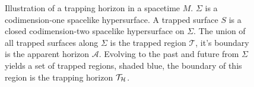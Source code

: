 \begin{figure}[!h]
\centering
{}
\label{fig:trappinghorizon}
\caption[Illustration of a trapping horizon in a spacetime $M$.]{Illustration of a trapping horizon in a spacetime $M$. $\Sigma$ is a codimension-one spacelike hypersurface. A trapped surface $S$ is a closed codimension-two spacelike hypersurface on $\Sigma$. The union of all trapped surfaces along $\Sigma$ is the trapped region $\mathcal{T}$, it's boundary is the apparent horizon $\mathcal{A}$. Evolving to the past and future from $\Sigma$ yields a set of trapped regions, shaded blue, the boundary of this region is the trapping horizon $\mathcal{T}_{\cal H}$.}
\end{figure}


